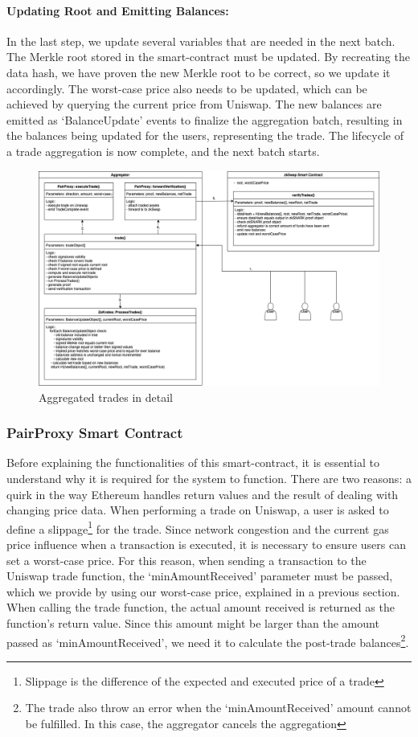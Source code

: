 \documentclass[../../thesis.tex]{subfiles}
\begin{document}
\paragraph{Updating Root and Emitting Balances:}
In the last step, we update several variables that are needed in the next batch. The Merkle root stored in the smart-contract must be updated. By recreating the data hash, we have proven the new Merkle root to be correct, so we update it accordingly. The worst-case price also needs to be updated, which can be achieved by querying the current price from Uniswap. The new balances are emitted as `BalanceUpdate' events to finalize the aggregation batch, resulting in the balances being updated for the users, representing the trade. The lifecycle of a trade aggregation is now complete, and the next batch starts.

\begin{figure}[h]
    \centerline{\includegraphics[totalheight=8cm]{diagrams/tradeAggregated.png}}
    \caption{Aggregated trades in detail}
    \label{fig:trade_aggr}
\end{figure}

\subsubsection{PairProxy Smart Contract} \label{pairProxy}
Before explaining the functionalities of this smart-contract, it is essential to understand why it is required for the system to function. There are two reasons: a quirk in the way Ethereum handles return values and the result of dealing with changing price data.
When performing a trade on Uniswap, a user is asked to define a slippage\footnote{Slippage is the difference of the expected and executed price of a trade} for the trade. Since network congestion and the current gas price influence when a transaction is executed, it is necessary to ensure users can set a worst-case price. For this reason, when sending a transaction to the Uniswap trade function, the `minAmountReceived' parameter must be passed, which we provide by using our worst-case price, explained in a previous section. When calling the trade function, the actual amount received is returned as the function's return value. Since this amount might be larger than the amount passed as `minAmountReceived', we need it to calculate the post-trade balances\footnote{The trade also throw an error when the `minAmountReceived' amount cannot be fulfilled. In this case, the aggregator cancels the aggregation}. 
\end{document}
